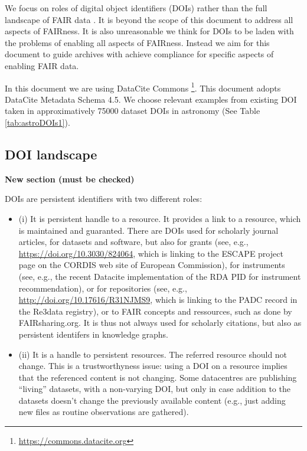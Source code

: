 \documentclass[11pt,a4paper]{ivoa}
\begin{document}
We focus on roles of digital object identifiers (DOIs) rather than the full landscape of FAIR data \citep{Wilkinson2016}. 
It is beyond the scope of this document to address all aspects of FAIRness.
It is also unreasonable we think for DOIs to be laden with the problems of enabling all aspects of FAIRness. 
Instead we aim for this document to guide archives with achieve compliance for specific aspects of enabling FAIR data.


In this document we are using DataCite Commons  \footnote{\url{https://commons.datacite.org}}. This document adopts DataCite Metadata Schema 4.5.
We choose relevant examples from existing DOI taken in approximatively 75000 dataset DOIs in astronomy (See Table \ref{tab:astroDOIs1}). 



\subsection{DOI landscape}
\textbf{\color{red}New section (must be checked)}



DOIs are persistent identifiers with two different roles:
\begin{itemize}
\item (i) It is persistent handle to a resource. It provides a link to
a resource, which is maintained and guaranted. There are DOIs used for 
scholarly journal articles, for datasets and software, but also for 
grants (see, e.g., \url{https://doi.org/10.3030/824064}, which is 
linking to the ESCAPE project page on the CORDIS web site of European 
Commission), for instruments (see, e.g., the recent Datacite 
implementation of the RDA PID for instrument recommendation), or for 
repositories (see, e.g., \url{http://doi.org/10.17616/R31NJMS9}, 
which is linking to the PADC record in the Re3data registry), or to 
FAIR concepts and ressources, such as done by FAIRsharing.org. It is 
thus not always used for scholarly citations, but also as persistent 
identifers in knowledge graphs.
\item (ii) It is a handle to persistent resources. The referred 
resource should not change. This is a trustworthyness issue: using a 
DOI on a resource implies that the referenced content is not changing. 
Some datacentres are publishing ``living'' datasets, with a 
non-varying DOI, but only in case addition to the datasets doesn't 
change the previously available content (e.g., just adding new files 
as routine observations are gathered).
\end{itemize}
\end{document}

